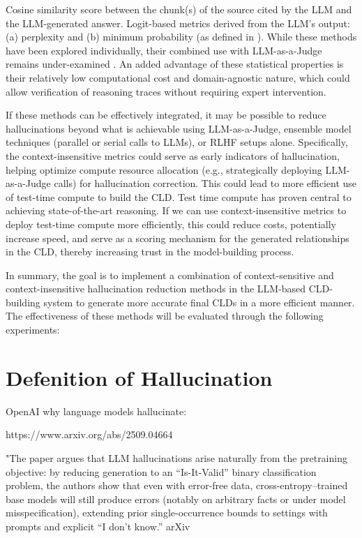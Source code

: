 
Cosine similarity score between the chunk(s) of the source cited by the LLM and the LLM-generated answer.
Logit-based metrics derived from the LLM’s output: (a) perplexity and (b) minimum probability (as defined in \cite{varshney2023stitch}).
While these methods have been explored individually, their combined use with LLM-as-a-Judge remains under-examined \cite{tonmoy2024comprehensive}. An added advantage of these statistical properties is their relatively low computational cost and domain-agnostic nature, which could allow verification of reasoning traces without requiring expert intervention.

If these methods can be effectively integrated, it may be possible to reduce hallucinations beyond what is achievable using LLM-as-a-Judge, ensemble model techniques (parallel or serial calls to LLMs), or RLHF setups alone. Specifically, the context-insensitive metrics could serve as early indicators of hallucination, helping optimize compute resource allocation (e.g., strategically deploying LLM-as-a-Judge calls) for hallucination correction. This could lead to more efficient use of test-time compute to build the CLD. Test time compute has proven central to achieving state-of-the-art reasoning. If we can use context-insensitive metrics to deploy test-time compute more efficiently, this could reduce costs, potentially increase speed, and serve as a scoring mechanism for the generated relationships in the CLD, thereby increasing trust in the model-building process.

In summary, the goal is to implement a combination of context-sensitive and context-insensitive hallucination reduction methods in the LLM-based CLD-building system to generate more accurate final CLDs in a more efficient manner. The effectiveness of these methods will be evaluated through the following experiments:



\section{Defenition of Hallucination}

OpenAI why language models hallucinate:

https://www.arxiv.org/abs/2509.04664


"The paper argues that LLM hallucinations arise naturally from the pretraining objective: by reducing generation to an “Is-It-Valid” binary classification problem, the authors show that even with error-free data, cross-entropy–trained base models will still produce errors (notably on arbitrary facts or under model misspecification), extending prior single-occurrence bounds to settings with prompts and explicit “I don’t know.” 
arXiv

